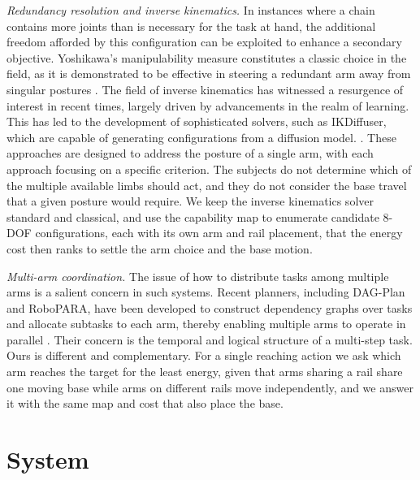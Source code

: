 \documentclass[conference]{IEEEtran}
\begin{document}
\noindent\textit{Redundancy resolution and inverse kinematics.}
In instances where a chain contains more joints than is necessary for 
the task at hand, the additional freedom afforded by this configuration can be 
exploited to enhance a secondary objective. Yoshikawa's manipulability measure 
constitutes a classic choice in the field, as it is demonstrated to be effective 
in steering a redundant arm away from singular postures \cite{Yoshikawa1985}.
The field of inverse kinematics has witnessed a resurgence of interest in recent times, 
largely driven by advancements in the realm of learning. This has led to the 
development of sophisticated solvers, such as IKDiffuser, which are capable of 
generating configurations from a diffusion model. \cite{IKDiffuser2025}. 
These approaches are designed to address the posture of a single arm, 
with each approach focusing on a specific criterion. 
The subjects do not determine which of the multiple available limbs should act, 
and they do not consider the base travel that a given posture would require. 
We keep the inverse kinematics solver standard and classical, and use the capability
map to enumerate candidate 8-DOF configurations, each with its own arm and rail
placement, that the energy cost then ranks to settle the arm choice and the base motion.

\noindent\textit{Multi-arm coordination.}
The issue of how to distribute tasks among multiple arms is a salient concern 
in such systems. Recent planners, including DAG-Plan and RoboPARA, 
have been developed to construct dependency graphs over tasks and allocate 
subtasks to each arm, thereby enabling multiple arms to operate in parallel
\cite{DAGPlan2024,RoboPARA2026}. Their concern is the temporal and logical structure
of a multi-step task. Ours is different and complementary. For a single reaching
action we ask which arm reaches the target for the least energy, given that arms
sharing a rail share one moving base while arms on different rails move independently, 
and we answer it with the same map and cost that also place the base.

\section{System}
\end{document}
